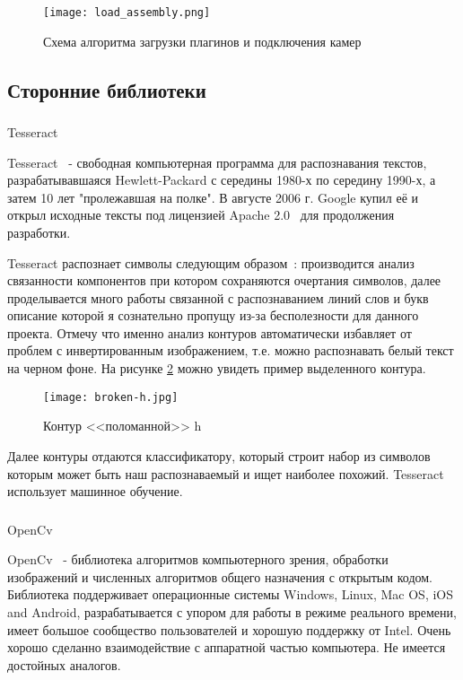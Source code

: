 \begin{figure}[p] 
    \centering
    \texttt{[image: load\_assembly.png]}  
    \caption{Схема алгоритма загрузки плагинов и подключения камер}
    \label{fig:creation:load_assemly}
\end{figure}

\subsection{Сторонние библиотеки}
\subsubsection{}
\label{sub:creation:tesseract}
Tesseract 

Tesseract~\cite{teseract} - свободная компьютерная программа для распознавания текстов, разрабатывавшаяся Hewlett-Packard с середины 1980-х по середину 1990-х, а затем 10 лет "пролежавшая на полке". В августе 2006 г. Google купил её и открыл исходные тексты под лицензией Apache 2.0~\cite{apache20} для продолжения разработки. 

Tesseract распознает символы следующим образом~\cite{tesseract_owerview}: производится анализ связанности компонентов при котором сохраняются очертания символов, далее проделывается много работы связанной с распознаванием линий слов и букв описание которой я сознательно пропущу из-за бесполезности для данного проекта. Отмечу что именно анализ контуров автоматически избавляет от проблем с инвертированным изображением, т.е. можно распознавать белый текст на черном фоне. На рисунке \ref{fig:domain:recognition:tesseract:hcountor} можно увидеть пример выделенного контура.
\begin{figure}[ht] 
    \centering
    \texttt{[image: broken-h.jpg]}  
    \caption{Контур <<поломанной>> h}
    \label{fig:domain:recognition:tesseract:hcountor}
\end{figure}

Далее контуры отдаются классификатору, который строит набор из символов которым может быть наш распознаваемый и ищет наиболее похожий. Tesseract использует машинное обучение.

\subsubsection{}
OpenCv

OpenCv~\cite{open_cv_en} - библиотека алгоритмов компьютерного зрения, обработки изображений и численных алгоритмов общего назначения с открытым кодом. Библиотека поддерживает операционные системы Windows, Linux, Mac OS, iOS and Android, разрабатывается с упором для работы в режиме реального времени, имеет большое сообщество пользователей и хорошую поддержку от Intel. Очень хорошо сделанно взаимодействие с аппаратной частью компьютера. Не имеется достойных аналогов.


